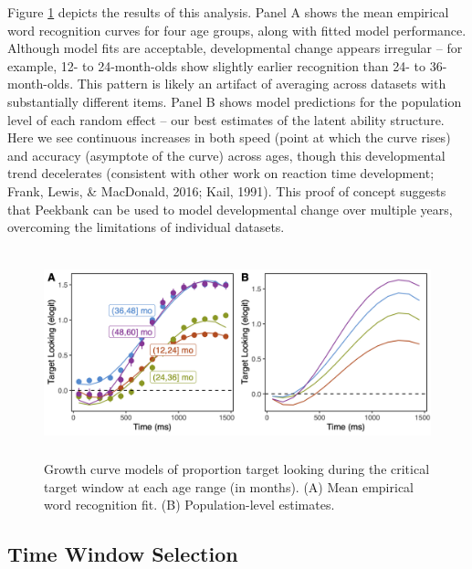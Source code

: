 \documentclass[10pt, letterpaper]{article}
\begin{document}
Figure \ref{fig:age_gca} depicts the results of this analysis. Panel A
shows the mean empirical word recognition curves for four age groups,
along with fitted model performance. Although model fits are acceptable,
developmental change appears irregular -- for example, 12- to
24-month-olds show slightly earlier recognition than 24- to
36-month-olds. This pattern is likely an artifact of averaging across
datasets with substantially different items. Panel B shows model
predictions for the population level of each random effect -- our best
estimates of the latent ability structure. Here we see continuous
increases in both speed (point at which the curve rises) and accuracy
(asymptote of the curve) across ages, though this developmental trend
decelerates (consistent with other work on reaction time development;
Frank, Lewis, \& MacDonald, 2016; Kail, 1991). This proof of concept
suggests that Peekbank can be used to model developmental change over
multiple years, overcoming the limitations of individual datasets.

\begin{figure} 
\includegraphics[width=14cm,height=6cm]{../figures/age_gca.png}
\caption{Growth curve models of proportion target looking during the critical target window at each age range (in months). (A) Mean empirical word recognition fit. (B) Population-level estimates.}
\label{fig:age_gca}
\end{figure}

\hypertarget{time-window-selection}{%
\subsection{Time Window Selection}\label{time-window-selection}}
\end{document}
